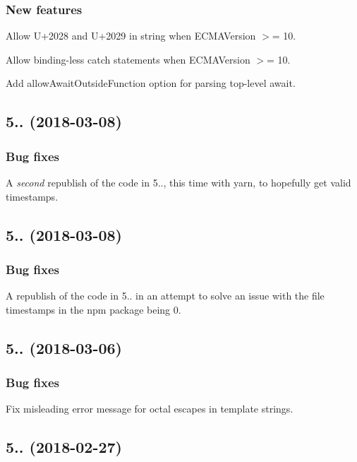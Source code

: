 \subsubsection*{New features}

Allow U+2028 and U+2029 in string when E\+C\+M\+A\+Version $>$= 10.

Allow binding-\/less catch statements when E\+C\+M\+A\+Version $>$= 10.

Add {\ttfamily allow\+Await\+Outside\+Function} option for parsing top-\/level {\ttfamily await}.

\subsection*{5.. (2018-\/03-\/08)}

\subsubsection*{Bug fixes}

A {\itshape second} republish of the code in 5.., this time with yarn, to hopefully get valid timestamps.

\subsection*{5.. (2018-\/03-\/08)}

\subsubsection*{Bug fixes}

A republish of the code in 5.. in an attempt to solve an issue with the file timestamps in the npm package being 0.

\subsection*{5.. (2018-\/03-\/06)}

\subsubsection*{Bug fixes}

Fix misleading error message for octal escapes in template strings.

\subsection*{5.. (2018-\/02-\/27)}

